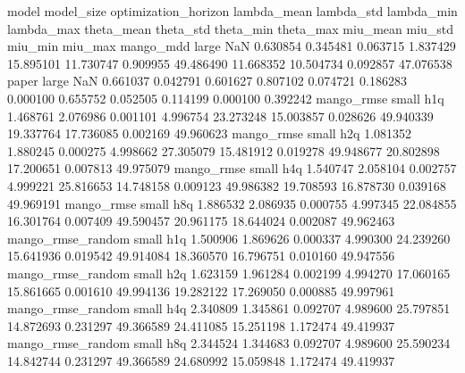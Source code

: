             model model_size optimization_horizon  lambda_mean  lambda_std  lambda_min  lambda_max  theta_mean  theta_std  theta_min  theta_max  miu_mean   miu_std  miu_min   miu_max
        mango_mdd      large                  NaN     0.630854    0.345481    0.063715    1.837429   15.895101  11.730747   0.909955  49.486490 11.668352 10.504734 0.092857 47.076538
            paper      large                  NaN     0.661037    0.042791    0.601627    0.807102    0.074721   0.186283   0.000100   0.655752  0.052505  0.114199 0.000100  0.392242
       mango_rmse      small                  h1q     1.468761    2.076986    0.001101    4.996754   23.273248  15.003857   0.028626  49.940339 19.337764 17.736085 0.002169 49.960623
       mango_rmse      small                  h2q     1.081352    1.880245    0.000275    4.998662   27.305079  15.481912   0.019278  49.948677 20.802898 17.200651 0.007813 49.975079
       mango_rmse      small                  h4q     1.540747    2.058104    0.002757    4.999221   25.816653  14.748158   0.009123  49.986382 19.708593 16.878730 0.039168 49.969191
       mango_rmse      small                  h8q     1.886532    2.086935    0.000755    4.997345   22.084855  16.301764   0.007409  49.590457 20.961175 18.644024 0.002087 49.962463
mango_rmse_random      small                  h1q     1.500906    1.869626    0.000337    4.990300   24.239260  15.641936   0.019542  49.914084 18.360570 16.796751 0.010160 49.947556
mango_rmse_random      small                  h2q     1.623159    1.961284    0.002199    4.994270   17.060165  15.861665   0.001610  49.994136 19.282122 17.269050 0.000885 49.997961
mango_rmse_random      small                  h4q     2.340809    1.345861    0.092707    4.989600   25.797851  14.872693   0.231297  49.366589 24.411085 15.251198 1.172474 49.419937
mango_rmse_random      small                  h8q     2.344524    1.344683    0.092707    4.989600   25.590234  14.842744   0.231297  49.366589 24.680992 15.059848 1.172474 49.419937